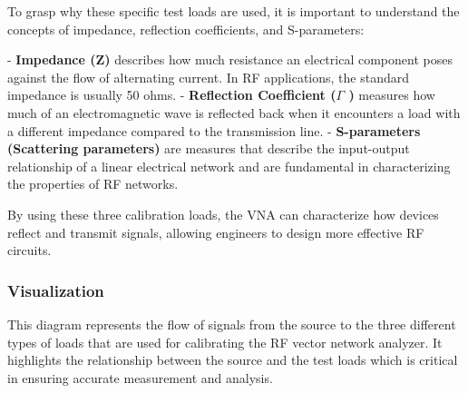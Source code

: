 To grasp why these specific test loads are used, it is important to understand the concepts of impedance, reflection coefficients, and S-parameters:

- \textbf{Impedance (Z)} describes how much resistance an electrical component poses against the flow of alternating current. In RF applications, the standard impedance is usually 50 ohms.
- \textbf{Reflection Coefficient ($ \Gamma $ )} measures how much of an electromagnetic wave is reflected back when it encounters a load with a different impedance compared to the transmission line.
- \textbf{S-parameters (Scattering parameters)} are measures that describe the input-output relationship of a linear electrical network and are fundamental in characterizing the properties of RF networks.

By using these three calibration loads, the VNA can characterize how devices reflect and transmit signals, allowing engineers to design more effective RF circuits.

\subsubsection{Visualization}


This diagram represents the flow of signals from the source to the three different types of loads that are used for calibrating the RF vector network analyzer. It highlights the relationship between the source and the test loads which is critical in ensuring accurate measurement and analysis.
